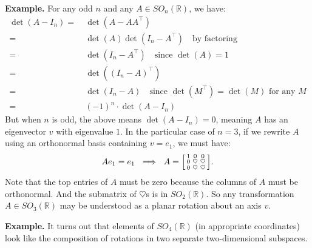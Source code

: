 \textbf{Example.} For any odd $n$ and any $A \in SO_n(\mathbb{R})$, we have:
\begin{align*}
\det (A - I_n) = \ &  \det (A - AA^{\top}) \\
= \ &  \det (A) \det (I_n - A^{\top}) ~~~ \text{ by factoring} \\
= \ & \det (I_n - A^{\top}) ~~~ \text{ since } \det(A) = 1\\
= \ & \det ((I_n - A)^{\top}) \\
= \ & \det (I_n - A) ~~~ \text{ since } \det(M^{\top}) = \det(M) \text{ for any } M \\
= \ & (-1)^n \cdot \det(A - I_n)
\end{align*}
But when $n$ is odd, the above means $\det (A - I_n) = 0$, meaning $A$ has an eigenvector $v$ with eigenvalue $1$.  In the particular case of $n = 3$, if we rewrite $A$ using an orthonormal basis containing $v = e_1$, we must have:
\[ Ae_1 = e_1 ~  \implies ~ A = \begin{bsmallmatrix} 1 & 0 & 0 \\ 0 & \heartsuit & \heartsuit \\ 0 & \heartsuit & \heartsuit \end{bsmallmatrix}. \]
Note that the top entries of $A$ must be zero because the columns of $A$ must be orthonormal.  And the submatrix of $\heartsuit$s is in $SO_2(\mathbb{R})$.  So any transformation $A \in SO_3(\mathbb{R})$ may be understood as a planar rotation about an axis $v$.

\textbf{Example.} It turns out that elements of $SO_4(\mathbb{R})$ (in appropriate coordinates) look like the composition of rotations in two separate two-dimensional subspaces.

